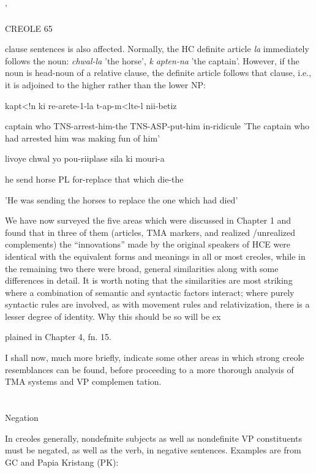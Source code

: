 '

CREOLE 65

clause sentences is also affected. Normally, the HC definite article \textit{la }immediately follows the noun: \textit{chwal-la} 'the horse', \textit{k} \textit{apten-na} 'the captain'. However, if the noun is head-noun of a relative clause, the definite article follows that clause, i.e., it is adjoined to the higher rather than the lower NP:

\ea\label{ex:50}
 kapt{\textless}!n ki re-arete{}-1{}-la t-ap-m{\textless}lte-l nii-betiz
\glt
\z

captain who TNS-arrest-him-the TNS-ASP-put-him in-ridicule 'The captain who had arrested him was making fun of him'

\ea\label{ex:51}
 livoye chwal yo pou-riiplase sila ki mouri-a
\glt
\z

he send horse PL for-replace that which die-the

'He was sending the horses to replace the one which had died'

We have now surveyed the five areas which were discussed in Chapter 1 and found that in three of them (articles, TMA markers, and realized /unrealized complements) the ``innovations'' made by the original speakers of HCE were identical with the equivalent forms and meanings in all or most creoles, while in the remaining two there were broad, general similarities along with some differences in detail. It is worth noting that the similarities are most striking where a combi\-nation of semantic and syntactic factors interact; where purely syn\-tactic rules are involved, as with movement rules and relativization, there is a lesser degree of identity. Why this should be so will be ex\-

plained in Chapter 4, fn. 15.

I shall now, much more briefly, indicate some other areas in which strong creole resemblances can be found, before proceeding to a more thorough analysis of TMA systems and VP complemen tation.

\section{}
Negation

In creoles generally, nondefmite subjects as well as nondefinite VP constituents must be negated, as well as the verb, in negative sen\-tences. Examples are from GC and Papia Kristang (PK):


